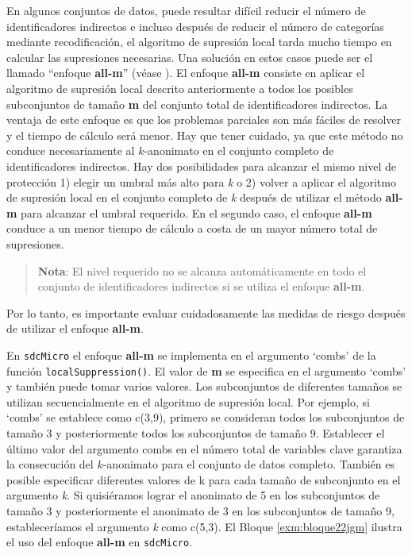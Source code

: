 \documentclass[
]{book}
\theoremstyle{definition}
\theoremstyle{definition}
\theoremstyle{definition}
\theoremstyle{definition}
\theoremstyle{remark}
\begin{document}
En algunos conjuntos de datos, puede resultar difícil reducir el número de identificadores indirectos e incluso después de reducir el número de categorías mediante recodificación, el algoritmo de supresión local tarda mucho tiempo en calcular las supresiones necesarias. Una solución en estos casos puede ser el llamado ``enfoque \textbf{all-m}'' (véase \citep{Wolf15}). El enfoque \textbf{all-m} consiste en aplicar el algoritmo de supresión local descrito anteriormente a todos los posibles subconjuntos de tamaño \textbf{m} del conjunto total de identificadores indirectos. La ventaja de este enfoque es que los problemas parciales son más fáciles de resolver y el tiempo de cálculo será menor. Hay que tener cuidado, ya que este método no conduce necesariamente al \(k\)-anonimato en el conjunto completo de identificadores indirectos. Hay dos posibilidades para alcanzar el mismo nivel de protección 1) elegir un umbral más alto para \emph{k} o 2) volver a aplicar el algoritmo de supresión local en el conjunto completo de \emph{k} después de utilizar el método \textbf{all-m} para alcanzar el umbral requerido. En el segundo caso, el enfoque \textbf{all-m} conduce a un menor tiempo de cálculo a costa de un mayor número total de supresiones.

\begin{quote}
\textbf{Nota}: El nivel requerido no se alcanza automáticamente en todo el conjunto de identificadores indirectos si se utiliza el enfoque \textbf{all-m}.
\end{quote}

Por lo tanto, es importante evaluar cuidadosamente las medidas de riesgo después de utilizar el enfoque \textbf{all-m}.

En \texttt{sdcMicro} el enfoque \textbf{all-m} se implementa en el argumento `combs' de la función \texttt{localSuppression()}. El valor de \textbf{m} se especifica en el argumento `combs' y también puede tomar varios valores. Los subconjuntos de diferentes tamaños se utilizan secuencialmente en el algoritmo de supresión local. Por ejemplo, si `combs' se establece como c(3,9), primero se consideran todos los subconjuntos de tamaño 3 y posteriormente todos los subconjuntos de tamaño 9. Establecer el último valor del argumento combs en el número total de variables clave garantiza la consecución del \(k\)-anonimato para el conjunto de datos completo. También es posible especificar diferentes valores de k para cada tamaño de subconjunto en el argumento \emph{k}. Si quisiéramos lograr el anonimato de 5 en los subconjuntos de tamaño 3 y posteriormente el anonimato de 3 en los subconjuntos de tamaño 9, estableceríamos el argumento \emph{k} como c(5,3). El Bloque \ref{exm:bloque22jgm} ilustra el uso del enfoque \textbf{all-m} en \texttt{sdcMicro}.
\end{document}
